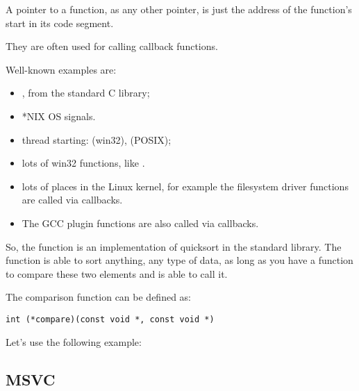 \newcommand{\comp}{\TT{comp()}\xspace}
\label{sec:pointerstofunctions}

\myindex{\CLanguageElements!\Pointers}

A pointer to a function, as any other pointer, is just the address of the function's start in its code segment.

They are often used for calling callback functions.

Well-known examples are:

\begin{itemize}
\item \qsort,  from the standard C library; 

\item *NIX OS signals.

\item thread starting:  (win32),  (POSIX);

\item lots of win32 functions, like .

\item lots of places in the Linux kernel, for example the filesystem driver functions are called via callbacks.

\item The GCC plugin functions are also called via callbacks.
\end{itemize}


So, the \qsort function is an implementation of quicksort in the \CCpp standard library. 
The function is able to sort anything, any type of data, as long as you have a function to compare these two elements 
and \qsort is able to call it.

The comparison function can be defined as:

\begin{lstlisting}
int (*compare)(const void *, const void *)
\end{lstlisting}

Let's use the following example:



\subsection{MSVC}

